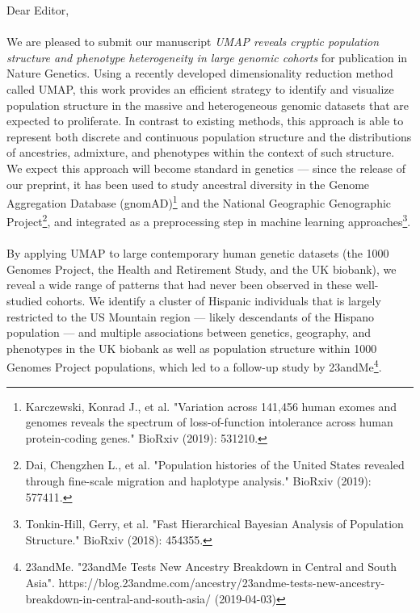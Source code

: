 \documentclass{article}
\begin{document}
Dear Editor,
\\\\
We are pleased to submit our manuscript \emph{UMAP reveals cryptic population structure and phenotype heterogeneity in large genomic cohorts} for publication in Nature Genetics. Using a recently developed dimensionality reduction method called UMAP, this work provides an efficient strategy to identify and visualize population structure in the massive and heterogeneous genomic datasets that are expected to proliferate. In contrast to existing methods, this approach is able to represent both discrete and continuous population structure and the distributions of ancestries, admixture, and phenotypes within the context of such structure. We expect this approach will become standard in genetics --- since the release of our preprint, it has been used to study ancestral diversity in the Genome Aggregation Database (gnomAD)\footnote{Karczewski, Konrad J., et al. "Variation across 141,456 human exomes and genomes reveals the spectrum of loss-of-function intolerance across human protein-coding genes." BioRxiv (2019): 531210.} and the National Geographic Genographic Project\footnote{Dai, Chengzhen L., et al. "Population histories of the United States revealed through fine-scale migration and haplotype analysis." BioRxiv (2019): 577411.}, and integrated as a preprocessing step in machine learning approaches\footnote{Tonkin-Hill, Gerry, et al. "Fast Hierarchical Bayesian Analysis of Population Structure." BioRxiv (2018): 454355.}.
\\\\
By applying UMAP to large contemporary human genetic datasets (the 1000 Genomes Project, the Health and Retirement Study, and the UK biobank), we reveal a wide range of patterns that had never been observed in these well-studied cohorts. We identify a cluster of Hispanic individuals that is largely restricted to the US Mountain region --- likely descendants of the Hispano population --- and  multiple associations between genetics, geography, and phenotypes in the UK biobank as well as population structure within 1000 Genomes Project populations, which led to a follow-up study by 23andMe\footnote{23andMe. "23andMe Tests New Ancestry Breakdown in Central and South Asia". https://blog.23andme.com/ancestry/23andme-tests-new-ancestry-breakdown-in-central-and-south-asia/ (2019-04-03)}.
\end{document}
